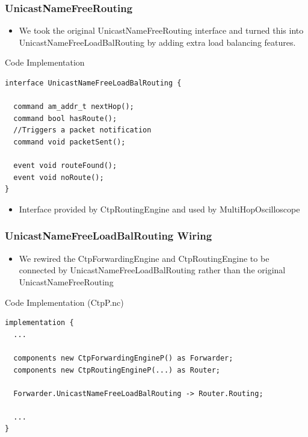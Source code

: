 \documentclass{beamer}
\begin{document}
\begin{frame}[fragile]
  \frametitle{UnicastNameFreeRouting}
  
    \begin{itemize}
      \item We took the original UnicastNameFreeRouting interface
            and turned this into UnicastNameFreeLoadBalRouting by adding extra
            load balancing features.
    \end{itemize}

  \footnotesize{
    \begin{block}{Code Implementation}
      \begin{verbatim}
interface UnicastNameFreeLoadBalRouting {

  command am_addr_t nextHop();
  command bool hasRoute();
  //Triggers a packet notification
  command void packetSent();
  
  event void routeFound();
  event void noRoute();
}
      \end{verbatim}
    \end{block}
  }
  \begin{itemize}
    \item Interface provided by CtpRoutingEngine and used by
    MultiHopOscilloscope
  \end{itemize}
\end{frame}


\begin{frame}[fragile]
  \frametitle{UnicastNameFreeLoadBalRouting Wiring}
  
    \begin{itemize}
      \item We rewired the CtpForwardingEngine and CtpRoutingEngine to be
      connected by UnicastNameFreeLoadBalRouting rather than the original
      UnicastNameFreeRouting
    \end{itemize}

  \footnotesize{
    \begin{block}{Code Implementation (CtpP.nc)}
      \begin{verbatim}
implementation {
  ...

  components new CtpForwardingEngineP() as Forwarder;
  components new CtpRoutingEngineP(...) as Router;

  Forwarder.UnicastNameFreeLoadBalRouting -> Router.Routing;

  ...
}
      \end{verbatim}
    \end{block}
  }
\end{frame}
\end{document}
